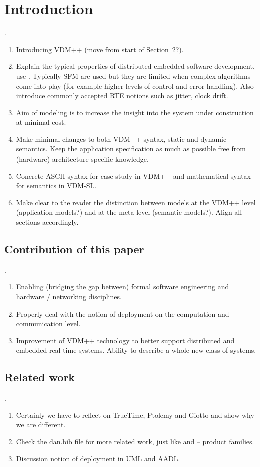 \section{Introduction}

\noindent \tbw.

\begin{enumerate}
\item Introducing VDM++ (move from start of Section~2?).
\item Explain the typical properties of distributed embedded
software development, use \cite{Lee05}. Typically SFM are used but
they are limited when complex algorithms come into play (for example
higher levels of control and error handling). Also introduce commonly
accepted RTE notions such as jitter, clock drift.
\item Aim of modeling is to increase the insight into the system
under construction at minimal cost.
\item Make minimal changes to both VDM++ syntax, static and
dynamic semantics. Keep the application specification as much
as possible free from (hardware) architecture specific knowledge.
\item Concrete ASCII syntax for case study in VDM++ and mathematical
syntax for semantics in VDM-SL.
\item Make clear to the reader the distinction between models at
the VDM++ level (application models?) and at the meta-level
(semantic models?). Align all sections accordingly.
\end{enumerate}

\subsection{Contribution of this paper}

\noindent \tbw.

\begin{enumerate}
\item Enabling (bridging the gap between) formal software engineering
and hardware / networking disciplines.
\item Properly deal with the notion of deployment on the 
computation and communication level.
\item Improvement of VDM++ technology to better support distributed
and embedded real-time systems. Ability to describe a whole new class
of systems.
\end{enumerate}

\subsection{Related work}

\noindent \tbw.

\begin{enumerate}
\item Certainly we have to reflect on TrueTime, Ptolemy and Giotto
and show why we are different.
\item Check the dan.bib file for more related work, just like
\cite{Huijsman&93} and \cite{Garlan&90b} -- product families.
\item Discussion notion of deployment in UML and AADL.
\end{enumerate}
